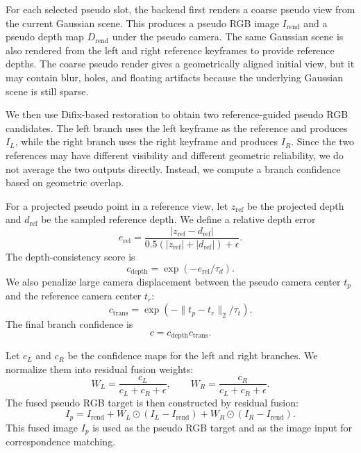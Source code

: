 For each selected pseudo slot, the backend first renders a coarse pseudo view from the current Gaussian scene. This produces a pseudo RGB image $I_{\mathrm{rend}}$ and a pseudo depth map $D_{\mathrm{rend}}$ under the pseudo camera. The same Gaussian scene is also rendered from the left and right reference keyframes to provide reference depths. The coarse pseudo render gives a geometrically aligned initial view, but it may contain blur, holes, and floating artifacts because the underlying Gaussian scene is still sparse.

We then use Difix-based restoration to obtain two reference-guided pseudo RGB candidates. The left branch uses the left keyframe as the reference and produces $I_L$, while the right branch uses the right keyframe and produces $I_R$. Since the two references may have different visibility and different geometric reliability, we do not average the two outputs directly. Instead, we compute a branch confidence based on geometric overlap.

For a projected pseudo point in a reference view, let $z_{\mathrm{ref}}$ be the projected depth and $d_{\mathrm{ref}}$ be the sampled reference depth. We define a relative depth error
\begin{equation}
e_{\mathrm{rel}}
=
\frac{|z_{\mathrm{ref}}-d_{\mathrm{ref}}|}
{0.5(|z_{\mathrm{ref}}|+|d_{\mathrm{ref}}|)+\epsilon}.
\end{equation}
The depth-consistency score is
\begin{equation}
c_{\mathrm{depth}}=\exp(-e_{\mathrm{rel}}/\tau_d).
\end{equation}
We also penalize large camera displacement between the pseudo camera center $t_p$ and the reference camera center $t_r$:
\begin{equation}
c_{\mathrm{trans}}=\exp(-\|t_p-t_r\|_2/\tau_t).
\end{equation}
The final branch confidence is
\begin{equation}
c = c_{\mathrm{depth}}c_{\mathrm{trans}} .
\end{equation}

Let $c_L$ and $c_R$ be the confidence maps for the left and right branches. We normalize them into residual fusion weights:
\begin{equation}
W_L=\frac{c_L}{c_L+c_R+\epsilon},\qquad
W_R=\frac{c_R}{c_L+c_R+\epsilon}.
\end{equation}
The fused pseudo RGB target is then constructed by residual fusion:
\begin{equation}
I_p
=
I_{\mathrm{rend}}
+
W_L\odot (I_L-I_{\mathrm{rend}})
+
W_R\odot (I_R-I_{\mathrm{rend}}).
\end{equation}
This fused image $I_p$ is used as the pseudo RGB target and as the image input for correspondence matching.

